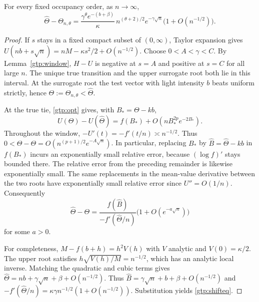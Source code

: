 \begin{theorem}\label{gtp:shift}
For every fixed occupancy order, as $n\to\infty$,
\begin{equation}\label{gtp:shifteq}
 \widehat\Theta-\Theta_{n,\theta}
 =\frac{\gamma^{\theta}e^{-(b+\beta)}}{\kappa}\,
 n^{(\theta+2)/2} e^{-\gamma\sqrt n}
 \bigl(1+O(n^{-1/2})\bigr).
\end{equation}
\end{theorem}
\begin{proof}
If $s$ stays in a fixed compact subset of $(0,\infty)$, Taylor expansion gives
$U(nb+s\sqrt n)=nM-\kappa s^2/2+O(n^{-1/2})$.
Choose $0<A<\gamma<C$. By Lemma~\ref{gtp:window}, $H-U$ is negative at
$s=A$ and positive at $s=C$ for all large $n$. The unique true transition
and the upper surrogate root both lie in this interval.
At the surrogate root the test vector with light intensity $b$ beats
uniform strictly, hence $\Theta:=\Theta_{n,\theta}<\widehat\Theta$.

At the true tie, \eqref{gtp:opt} gives, with $B_*=\Theta-kb$,
\[
 U(\Theta)-U(\widehat\Theta)
 = f(B_*)+O(nB_*^{2p}e^{-2B_*}).
\]
Throughout the window, $-U'(t)=-f'(t/n)\asymp n^{-1/2}$. Thus
$0<\widehat\Theta-\Theta=O(n^{(p+1)/2}e^{-A\sqrt n})$.
In particular, replacing $B_*$ by $\widehat B=\widehat\Theta-kb$ in
$f(B_*)$ incurs an exponentially small relative error, because
$(\log f)'$ stays bounded there. The relative error from the preceding
remainder is likewise exponentially small. The same replacements in the
mean-value derivative between the two roots have exponentially small
relative error since $U''=O(1/n)$. Consequently
\[
 \widehat\Theta-\Theta
 =\frac{f(\widehat B)}{-f'(\widehat\Theta/n)}
   \bigl(1+O(e^{-a\sqrt n})\bigr)
\]
for some $a>0$.

For completeness, $M-f(b+h)=h^2 V(h)$ with $V$ analytic and
$V(0)=\kappa/2$. The upper root satisfies
$h\sqrt{V(h)/M}=n^{-1/2}$, which has an analytic local inverse.
Matching the quadratic and cubic terms gives
$\widehat\Theta=nb+\gamma\sqrt n+\beta+O(n^{-1/2})$.
Thus $\widehat B=\gamma\sqrt n+b+\beta+O(n^{-1/2})$ and
$-f'(\widehat\Theta/n)=\kappa\gamma n^{-1/2}(1+O(n^{-1/2}))$.
Substitution yields \eqref{gtp:shifteq}.
\end{proof}

